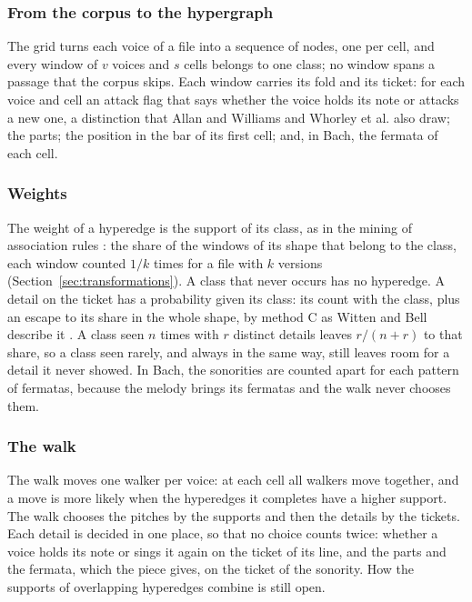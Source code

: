 \subsubsection{From the corpus to the hypergraph}
The grid turns each voice of a file into a sequence of nodes, one per cell, and every window of $v$ voices and $s$ cells belongs to one class; no window spans a passage that the corpus skips. Each window carries its fold and its ticket: for each voice and cell an attack flag that says whether the voice holds its note or attacks a new one, a distinction that Allan and Williams \cite{allan2004} and Whorley et al. \cite{whorley2013} also draw; the parts; the position in the bar of its first cell; and, in Bach, the fermata of each cell.

\subsubsection{Weights}
The weight of a hyperedge is the support of its class, as in the mining of association rules \cite{agrawal1993}: the share of the windows of its shape that belong to the class, each window counted $1/k$ times for a file with $k$ versions (Section~\ref{sec:transformations}). A class that never occurs has no hyperedge. A detail on the ticket has a probability given its class: its count with the class, plus an escape to its share in the whole shape, by method C as Witten and Bell describe it \cite{witten1991}. A class seen $n$ times with $r$ distinct details leaves $r/(n+r)$ to that share, so a class seen rarely, and always in the same way, still leaves room for a detail it never showed. In Bach, the sonorities are counted apart for each pattern of fermatas, because the melody brings its fermatas and the walk never chooses them.

\subsubsection{The walk}
The walk moves one walker per voice: at each cell all walkers move together, and a move is more likely when the hyperedges it completes have a higher support. The walk chooses the pitches by the supports and then the details by the tickets. Each detail is decided in one place, so that no choice counts twice: whether a voice holds its note or sings it again on the ticket of its line, and the parts and the fermata, which the piece gives, on the ticket of the sonority. How the supports of overlapping hyperedges combine is still open.

